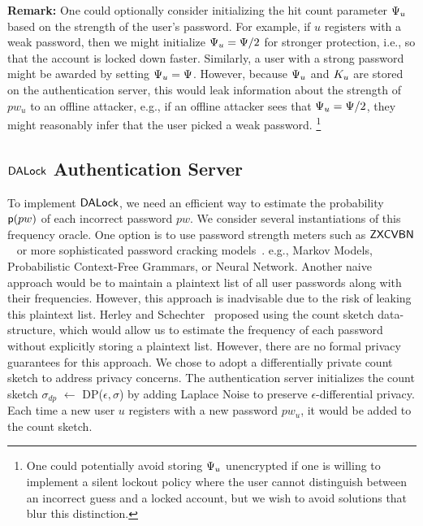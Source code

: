 {\noindent \bf Remark:} One could optionally consider initializing the hit count parameter $\Psi_{u}$ based on the strength of the user's password. For example, if $u$ registers with a weak password, then we might initialize $\Psi_{u} = \Psi/2$ for stronger protection, i.e., so that the account is locked down faster. Similarly, a user with a strong password might be awarded by setting $\Psi_{u} = \Psi$. However, because $\Psi_{u}$ and $K_{u}$ are stored on the authentication server, this would leak information about the strength of $pw_u$ to an offline attacker, e.g., if an offline attacker sees that $\Psi_{u} = \Psi/2$, they might reasonably infer that the user picked a weak password. \footnote{One could potentially avoid storing $\Psi_{u}$ unencrypted if one is willing to implement a silent lockout policy where the user cannot distinguish between an incorrect guess and a locked account, but we wish to avoid solutions that blur this distinction.}  

\vspace{-0.2cm}
\subsection{$\mathsf{DALock}$ Authentication Server} %

To implement $\mathsf{DALock}$, we need an efficient way to estimate the probability $\textsf{p}(pw)$ of each incorrect password $pw$. We consider several instantiations of this frequency oracle. One option is to use password strength meters such as $\mathsf{ZXCVBN}$ ~\cite{USENIX:Wheeler16} or more sophisticated password cracking models~\cite{ USENIX:USBCCKKMMS15,USENIX:MUSKBCC16}. e.g., Markov Models, Probabilistic Context-Free Grammars, or Neural Network. Another naive approach would be to maintain a plaintext list of all user passwords along with their frequencies. However, this approach is inadvisable due to the risk of leaking this plaintext list. Herley and Schechter~\cite{HTS:SchHerMit10} proposed using the count sketch data-structure, which would allow us to estimate the frequency of each password without explicitly storing a plaintext list. However, there are no formal privacy guarantees for this approach. We chose to adopt a differentially private count sketch to address privacy concerns. The authentication server initializes the count sketch $\sigma_{dp}$ $\leftarrow$  DP($\epsilon, \sigma$) by adding Laplace Noise to preserve $\epsilon$-differential privacy. Each time a new user $u$ registers with a new password $pw_u$, it would be added to the count sketch.

